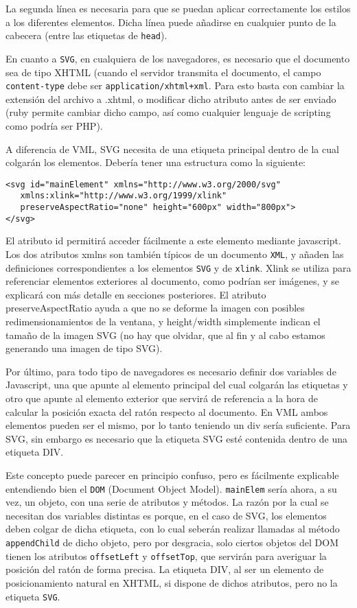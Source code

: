 La segunda línea es necesaria para que se puedan aplicar correctamente los estilos a los diferentes elementos. Dicha línea puede añadirse en cualquier punto de la cabecera (entre las etiquetas de \texttt{head}).

En cuanto a \texttt{SVG}, en cualquiera de los navegadores, es necesario que el documento sea de tipo XHTML (cuando el servidor transmita el documento, el campo \texttt{content-type} debe ser \texttt{application/xhtml+xml}. Para esto basta con cambiar la extensión del archivo a .xhtml, o modificar dicho atributo antes de ser enviado (ruby permite cambiar dicho campo, así como cualquier lenguaje de scripting como podría ser PHP). 

A diferencia de VML, SVG necesita de una etiqueta principal dentro de la cual colgarán los elementos. Debería tener una estructura como la siguiente:

\begin{verbatim}
<svg id="mainElement" xmlns="http://www.w3.org/2000/svg" 
   xmlns:xlink="http://www.w3.org/1999/xlink" 
   preserveAspectRatio="none" height="600px" width="800px">
</svg>
\end{verbatim}

El atributo id permitirá acceder fácilmente a este elemento mediante javascript. Los dos atributos xmlns son también típicos de un documento \texttt{XML}, y añaden las definiciones correspondientes a los elementos \texttt{SVG} y de \texttt{xlink}. Xlink se utiliza para referenciar elementos exteriores al documento, como podrían ser imágenes, y se explicará con más detalle en secciones posteriores. El atributo preserveAspectRatio ayuda a que no se deforme la imagen con posibles redimensionamientos de la ventana, y height/width simplemente indican el tamaño de la imagen SVG (no hay que olvidar, que al fin y al cabo estamos generando una imagen de tipo SVG).

Por último, para todo tipo de navegadores es necesario definir dos variables de Javascript, una que apunte al elemento principal del cual colgarán las etiquetas y otro que apunte al elemento exterior que servirá de referencia a la hora de calcular la posición exacta del ratón respecto al documento. En VML ambos elementos pueden ser el mismo, por lo tanto teniendo un div sería suficiente. Para SVG, sin embargo es necesario que la etiqueta SVG esté contenida dentro de una etiqueta DIV.

Este concepto puede parecer en principio confuso, pero es fácilmente explicable entendiendo bien el \texttt{DOM} (Document Object Model).
\texttt{mainElem} sería ahora, a su vez, un objeto, con una serie de atributos y métodos. La razón por la cual se necesitan dos variables distintas es porque, en el caso de SVG, los elementos deben colgar de dicha etiqueta, con lo cual seberán realizar llamadas al método \texttt{appendChild} de dicho objeto, pero por desgracia, solo ciertos objetos del DOM tienen los atributos \texttt{offsetLeft} y \texttt{offsetTop}, que servirán para averiguar la posición del ratón de forma precisa. La etiqueta DIV, al ser un elemento de posicionamiento natural en XHTML, si dispone de dichos atributos, pero no la etiqueta \texttt{SVG}.

